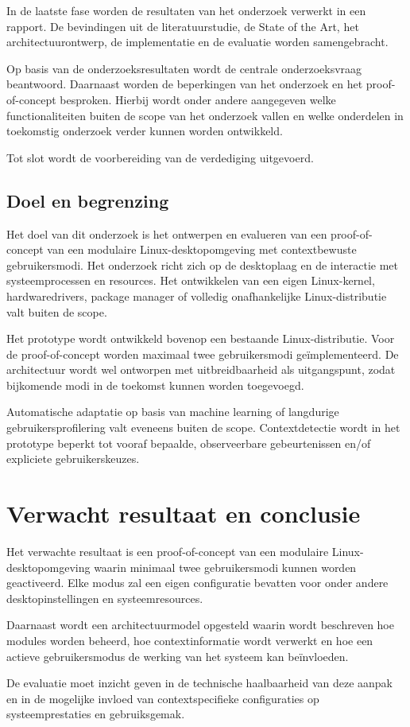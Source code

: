 \documentclass{hogent-article}
\begin{document}
In de laatste fase worden de resultaten van het onderzoek verwerkt in een rapport. De bevindingen uit de literatuurstudie, de State of the Art, het architectuurontwerp, de implementatie en de evaluatie worden samengebracht.

Op basis van de onderzoeksresultaten wordt de centrale onderzoeksvraag beantwoord. Daarnaast worden de beperkingen van het onderzoek en het proof-of-concept besproken. Hierbij wordt onder andere aangegeven welke functionaliteiten buiten de scope van het onderzoek vallen en welke onderdelen in toekomstig onderzoek verder kunnen worden ontwikkeld.

Tot slot wordt de voorbereiding van de verdediging uitgevoerd.

\subsection{Doel en begrenzing}
\label{ssec:beperkingen}

Het doel van dit onderzoek is het ontwerpen en evalueren van een proof-of-concept van een modulaire Linux-desktopomgeving met contextbewuste gebruikersmodi. Het onderzoek richt zich op de desktoplaag en de interactie met systeemprocessen en resources. Het ontwikkelen van een eigen Linux-kernel, hardwaredrivers, package manager of volledig onafhankelijke Linux-distributie valt buiten de scope.

Het prototype wordt ontwikkeld bovenop een bestaande Linux-distributie. Voor de proof-of-concept worden maximaal twee gebruikersmodi geïmplementeerd. De architectuur wordt wel ontworpen met uitbreidbaarheid als uitgangspunt, zodat bijkomende modi in de toekomst kunnen worden toegevoegd.

Automatische adaptatie op basis van machine learning of langdurige gebruikersprofilering valt eveneens buiten de scope. Contextdetectie wordt in het prototype beperkt tot vooraf bepaalde, observeerbare gebeurtenissen en/of expliciete gebruikerskeuzes.

\section{Verwacht resultaat en conclusie}
\label{sec:results}

Het verwachte resultaat is een proof-of-concept van een modulaire Linux-desktopomgeving waarin minimaal twee gebruikersmodi kunnen worden geactiveerd. Elke modus zal een eigen configuratie bevatten voor onder andere desktopinstellingen en systeemresources.

Daarnaast wordt een architectuurmodel opgesteld waarin wordt beschreven hoe modules worden beheerd, hoe contextinformatie wordt verwerkt en hoe een actieve gebruikersmodus de werking van het systeem kan beïnvloeden.

De evaluatie moet inzicht geven in de technische haalbaarheid van deze aanpak en in de mogelijke invloed van contextspecifieke configuraties op systeemprestaties en gebruiksgemak.

\printbibliography[heading=bibintoc]
\end{document}
